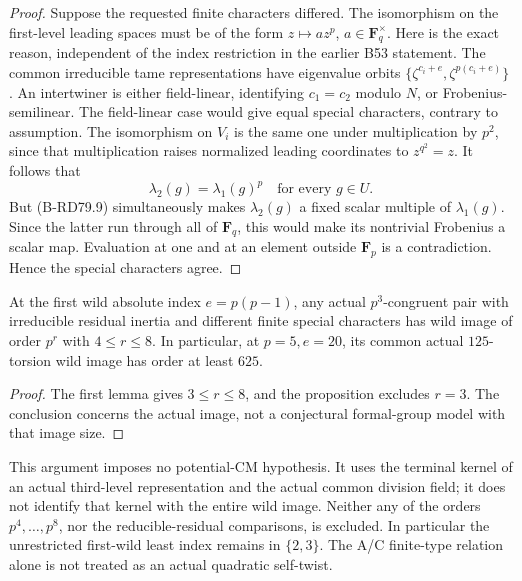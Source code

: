 \begin{proof}
Suppose the requested finite characters differed. The isomorphism
on the first-level leading spaces must be of the form
\(z\mapsto a z^p\), \(a\in\mathbf F_q^\times\).
Here is the exact reason, independent of the index restriction
in the earlier B53 statement. The common irreducible tame
representations have eigenvalue orbits
\(\{\zeta^{c_i+e},\zeta^{p(c_i+e)}\}\).
An intertwiner is either field-linear, identifying \(c_1=c_2\)
modulo \(N\), or Frobenius-semilinear. The field-linear case
would give equal special characters, contrary to assumption.
The isomorphism on \(V_i\) is the same one under multiplication
by \(p^2\), since that multiplication raises normalized leading
coordinates to \(z^{q^2}=z\).
It follows that
\[
            \lambda_2(g)=\lambda_1(g)^p
                        \quad\text{for every }g\in U.
                                                     \tag{B-RD79.10}
\]
But (B-RD79.9) simultaneously makes \(\lambda_2(g)\) a fixed
scalar multiple of \(\lambda_1(g)\). Since the latter run through
all of \(\mathbf F_q\), this would make its nontrivial Frobenius
a scalar map. Evaluation at one and at an element outside
\(\mathbf F_p\) is a contradiction. Hence the special characters
agree.
\end{proof}

\begin{corollary}
\label{cor:B-RD79}
At the first wild absolute index \(e=p(p-1)\), any actual
\(p^3\)-congruent pair with irreducible residual inertia and
different finite special characters has wild image of order
\(p^r\) with \(4\le r\le8\).
In particular, at \(p=5,e=20\), its common actual \(125\)-torsion
wild image has order at least \(625\).
\end{corollary}
\begin{proof}
The first lemma gives \(3\le r\le8\), and the proposition
excludes \(r=3\). The conclusion concerns the actual image,
not a conjectural formal-group model with that image size.
\end{proof}

\begin{remark}
\label{rem:B-RD79-scope}
This argument imposes no potential-CM hypothesis. It uses the
terminal kernel of an actual third-level representation and
the actual common division field; it does not identify that
kernel with the entire wild image. Neither any of the orders
\(p^4,\ldots,p^8\), nor the reducible-residual comparisons, is
excluded. In particular the unrestricted first-wild least
index remains in \(\{2,3\}\). The A/C finite-type relation alone
is not treated as an actual quadratic self-twist.
\end{remark}

